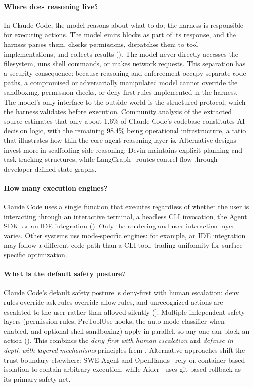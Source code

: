 \paragraph{Where does reasoning live?}
In Claude Code, the model reasons about what to do; the harness is responsible for executing actions. The model emits  blocks as part of its response, and the harness parses them, checks permissions, dispatches them to tool implementations, and collects results (). The model never directly accesses the filesystem, runs shell commands, or makes network requests. This separation has a security consequence: because reasoning and enforcement occupy separate code paths, a compromised or adversarially manipulated model cannot override the sandboxing, permission checks, or deny-first rules implemented in the harness. The model's only interface to the outside world is the structured  protocol, which the harness validates before execution. Community analysis of the extracted source estimates that only about 1.6\% of Claude Code's codebase constitutes AI decision logic, with the remaining 98.4\% being operational infrastructure, a ratio that illustrates how thin the core agent reasoning layer is. Alternative designs invest more in scaffolding-side reasoning: Devin maintains explicit planning and task-tracking structures, while LangGraph~\citep{langgraph2024} routes control flow through developer-defined state graphs.

\paragraph{How many execution engines?}
Claude Code uses a single  function that executes regardless of whether the user is interacting through an interactive terminal, a headless CLI invocation, the Agent SDK, or an IDE integration (). Only the rendering and user-interaction layer varies. Other systems use mode-specific engines: for example, an IDE integration may follow a different code path than a CLI tool, trading uniformity for surface-specific optimization.

\paragraph{What is the default safety posture?}
Claude Code's default safety posture is deny-first with human escalation: deny rules override ask rules override allow rules, and unrecognized actions are escalated to the user rather than allowed silently (). Multiple independent safety layers (permission rules, PreToolUse hooks, the auto-mode classifier when enabled, and optional shell sandboxing) apply in parallel, so any one can block an action (). This combines the \emph{deny-first with human escalation} and \emph{defense in depth with layered mechanisms} principles from . Alternative approaches shift the trust boundary elsewhere: SWE-Agent and OpenHands~\citep{yang2024sweagent,wang2024openhands} rely on container-based isolation to contain arbitrary execution, while Aider~\citep{gauthier2024aider} uses git-based rollback as its primary safety net.


